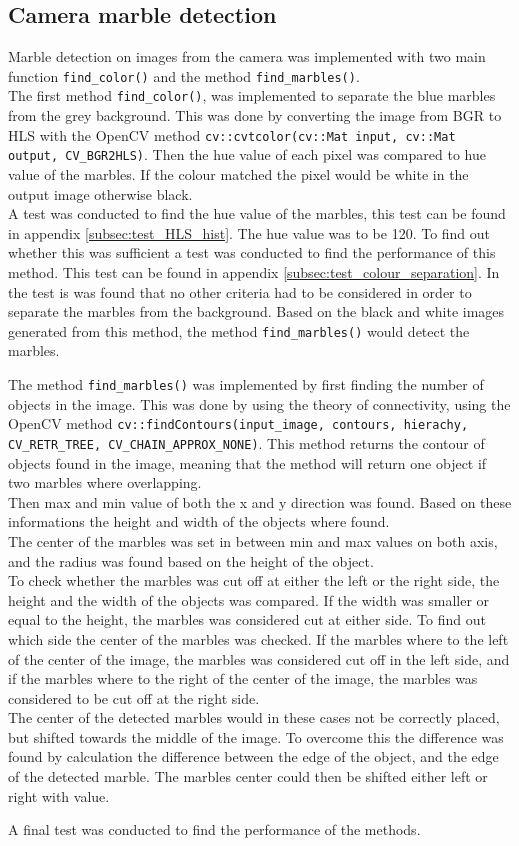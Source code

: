 \documentclass[../Head/Main.tex]{subfiles}
\begin{document}
\subsection{Camera marble detection}
Marble detection on images from the camera was implemented with two main function \texttt{find\_color()} and the method \texttt{find\_marbles()}.\\
The first method \texttt{find\_color()}, was implemented to separate the blue marbles from the grey background. This was done by converting the image from BGR to HLS with the OpenCV method \texttt{cv::cvtcolor(cv::Mat input, cv::Mat output, CV\_BGR2HLS)}. Then the hue value of each pixel was compared to hue value of the marbles. If the colour matched the pixel would be white in the output image otherwise black.\\
A test was conducted to find the hue value of the marbles, this test can be found in appendix \ref{subsec:test_HLS_hist}. The hue value was to be 120. To find out whether this was sufficient a test was conducted to find the performance of this method. This test can be found in appendix \ref{subsec:test_colour_separation}. In the test is was found that no other criteria had to be considered in order to separate the marbles from the background. Based on the black and white images generated from this method, the method \texttt{find\_marbles()} would detect the marbles.\par 

The method \texttt{find\_marbles()} was implemented by first finding the number of objects in the image. This was done by using the theory of connectivity, using the OpenCV method \texttt{cv::findContours(input\_image, contours, hierachy, CV\_RETR\_TREE, CV\_CHAIN\_APPROX\_NONE)}. This method returns the contour of objects found in the image, meaning that the method will return one object if two marbles where overlapping.\\
Then max and min value of both the x and y direction was found. Based on these informations the height and width of the objects where found.\\
The center of the marbles was set in between min and max values on both axis, and the radius was found based on the height of the object.\\
To check whether the marbles was cut off at either the left or the right side, the height and the width of the objects was compared. If the width was smaller or equal to the height, the marbles was considered cut at either side. To find out which side the center of the marbles was checked. If the marbles where to the left of the center of the image, the marbles was considered cut off in the left side, and if the marbles where to the right of the center of the image, the marbles was considered to be cut off at the right side.\\
The center of the detected marbles would in these cases not be correctly placed, but shifted towards the middle of the image. To overcome this the difference was found by calculation the difference between the edge of the object, and the edge of the detected marble. The marbles center could then be shifted either left or right with value.\par 
A final test was conducted to find the performance of the methods. 
\end{document}
